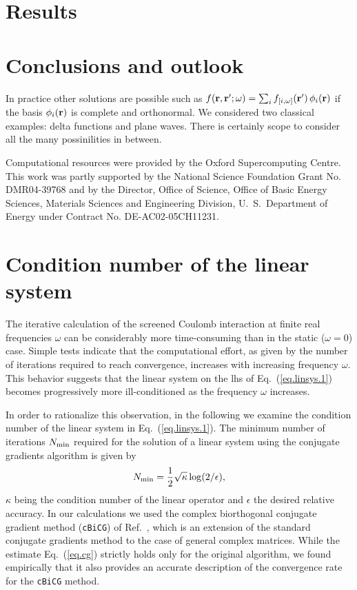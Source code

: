 \documentclass[twocolumn,prb,showpacs,superscriptaddress]{revtex4}
\def\w{\omega}
\def\r{{\bf r}}
\def\rp{{\bf r^\prime}}
\begin{document}
\section{Results}

\section{Conclusions and outlook}

In practice other solutions are possible such as $f(\r,\rp;\w) = \sum_i f_{[i,\w]}(\rp) \, \phi_i(\r)$
if the basis $\phi_i(\r)$ is complete and orthonormal. We considered two classical
examples: delta functions and plane waves. There is certainly scope to consider
all the many possinilities in between.

\begin{acknowledgments}
Computational resources were provided by the Oxford Supercomputing Centre.
This work was partly supported by the National Science Foundation Grant No. DMR04-39768 and by
the Director, Office of Science, Office of Basic Energy Sciences, Materials Sciences
and Engineering Division, U.\ S.\ Department of Energy under Contract No. DE-AC02-05CH11231.
\end{acknowledgments}

\appendix

\section{Condition number of the linear system}

The iterative calculation of the screened Coulomb interaction at finite real
frequencies $\w$ can be considerably more time-consuming than in the static
($\w=0$) case. Simple tests indicate that the computational effort, as given
by the number of iterations required to reach convergence, increases with 
increasing frequency $\w$. This behavior suggests that the linear system 
on the lhs of Eq.\ (\ref{eq.linsys.1}) becomes progressively more ill-conditioned 
as the frequency $\w$ increases.

In order to rationalize this observation, in the following we examine
the condition number of the linear system in Eq.\ (\ref{eq.linsys.1}).
The minimum number of iterations $N_{\rm min}$ required for the solution of
a linear system using the conjugate gradients algorithm is given by
  \begin{equation}\label{eq.cg}
  N_{\rm min} = \frac{1}{2}\sqrt{\kappa} \log(2/\epsilon),
  \end{equation}
$\kappa$ being the condition number of the linear operator and $\epsilon$ the
desired relative accuracy.\cite{painless.cg} In our calculations we used the 
complex biorthogonal conjugate gradient method ({\tt cBiCG}) of Ref.\ ,
which is an extension of the standard conjugate gradients method to the 
case of general complex matrices. While the estimate Eq.\ (\ref{eq.cg}) strictly 
holds only for the original algorithm, we found empirically that it also 
provides an accurate description of the convergence rate for the {\tt cBiCG} 
method.
\end{document}
